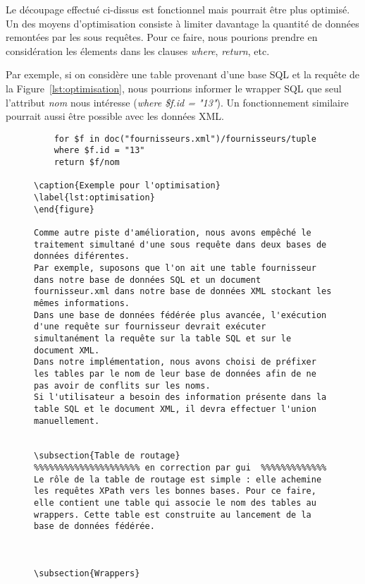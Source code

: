 \documentclass[a4paper,10pt]{article}
\newcommand{\fref}[1]{Figure~\ref{#1}}
\begin{document}
Le découpage effectué ci-dissus est fonctionnel mais pourrait être plus optimisé. Un des moyens d'optimisation consiste à limiter davantage la quantité de données remontées par les sous requêtes.
Pour ce faire, nous pourions prendre en considération les élements dans les clauses \emph{where}, \emph{return}, etc. 

Par exemple, si on considère une table provenant d'une base SQL et la requête de la \fref{lst:optimisation}, nous pourrions informer le wrapper SQL que seul l'attribut \emph{nom} nous intéresse (\emph{where \$f.id = "13"}). Un fonctionnement similaire pourrait aussi être possible avec les données XML.

\begin{figure}[ht!]
\begin{verbatim}
	for $f in doc("fournisseurs.xml")/fournisseurs/tuple
    where $f.id = "13"
    return $f/nom

\caption{Exemple pour l'optimisation}
\label{lst:optimisation}
\end{figure}

Comme autre piste d'amélioration, nous avons empêché le traitement simultané d'une sous requête dans deux bases de données diférentes.
Par exemple, suposons que l'on ait une table fournisseur dans notre base de données SQL et un document fournisseur.xml dans notre base de données XML stockant les mêmes informations.
Dans une base de données fédérée plus avancée, l'exécution d'une requête sur fournisseur devrait exécuter simultanément la requête sur la table SQL et sur le document XML.
Dans notre implémentation, nous avons choisi de préfixer les tables par le nom de leur base de données afin de ne pas avoir de conflits sur les noms.
Si l'utilisateur a besoin des information présente dans la table SQL et le document XML, il devra effectuer l'union manuellement.


\subsection{Table de routage}
%%%%%%%%%%%%%%%%%%%%% en correction par gui  %%%%%%%%%%%%%
Le rôle de la table de routage est simple : elle achemine les requêtes XPath vers les bonnes bases. Pour ce faire, elle contient une table qui associe le nom des tables au wrappers. Cette table est construite au lancement de la base de données fédérée.



\subsection{Wrappers}


\end{verbatim}
\end{figure}
\end{document}
